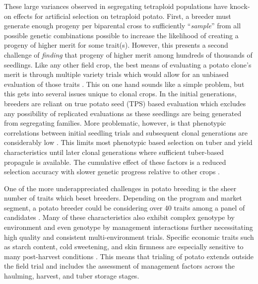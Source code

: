 \begin{refsection}
These large variances observed in segregating tetraploid populations
have knock-on effects for artificial selection on tetraploid potato.
First, a breeder must generate enough progeny per biparental cross to
sufficiently ``\emph{sample}'' from all possible genetic combinations
possible to increase the likelihood of creating a progeny of higher
merit for some trait(s). However, this presents a second challenge of
\emph{finding} that progeny of higher merit among hundreds of thousands
of seedlings. Like any other field crop, the best means of evaluating a
potato clone's merit is through multiple variety trials which would
allow for an unbiased evaluation of those traits \parencite{Smith2005}.
This on one hand sounds like a simple problem, but this gets into
several issues unique to clonal crops. In the initial generations,
breeders are reliant on true potato seed (TPS) based evaluation which
excludes any possibility of replicated evaluations as these seedlings
are being generated from segregating families. More problematic,
however, is that phenotypic correlations between initial seedling trials
and subsequent clonal generations are considerably low
\parencite{Maris1988,Gu2025}. This limits most phenotypic based selection
on tuber and yield characteristics until later clonal generations where
sufficient tuber-based propagule is available. The cumulative effect of
these factors is a reduced selection accuracy with slower genetic
progress relative to other crops \parencite{Gopal2015}.

One of the more underappreciated challenges in potato breeding is the
sheer number of traits which beset breeders. Depending on the program
and market segment, a potato breeder could be considering over 40 traits
among a panel of candidates \parencite{Gebhardt2013}. Many of these
characteristics also exhibit complex genotype by environment and even
genotype by management interactions further necessitating high quality
and consistent multi-environment trials. Specific economic traits such
as starch content, cold sweetening, and skin firmness are especially
sensitive to many post-harvest conditions \parencite{Jansky2006}. This
means that trialing of potato extends outside the field trial and
includes the assessment of management factors across the haulming,
harvest, and tuber storage stages.


\end{refsection}
